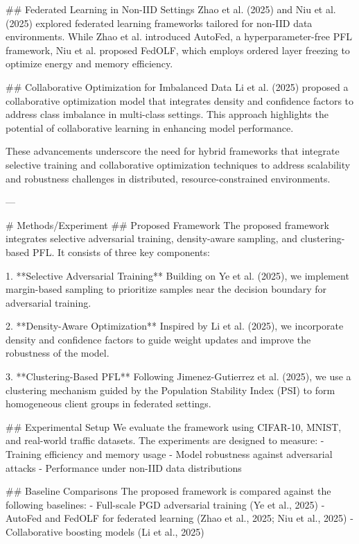 ## Federated Learning in Non-IID Settings  
Zhao et al. (2025) and Niu et al. (2025) explored federated learning frameworks tailored for non-IID data environments. While Zhao et al. introduced AutoFed, a hyperparameter-free PFL framework, Niu et al. proposed FedOLF, which employs ordered layer freezing to optimize energy and memory efficiency.  

## Collaborative Optimization for Imbalanced Data  
Li et al. (2025) proposed a collaborative optimization model that integrates density and confidence factors to address class imbalance in multi-class settings. This approach highlights the potential of collaborative learning in enhancing model performance.  

These advancements underscore the need for hybrid frameworks that integrate selective training and collaborative optimization techniques to address scalability and robustness challenges in distributed, resource-constrained environments.  

---

# Methods/Experiment  
## Proposed Framework  
The proposed framework integrates selective adversarial training, density-aware sampling, and clustering-based PFL. It consists of three key components:  

1. **Selective Adversarial Training**  
   Building on Ye et al. (2025), we implement margin-based sampling to prioritize samples near the decision boundary for adversarial training.  

2. **Density-Aware Optimization**  
   Inspired by Li et al. (2025), we incorporate density and confidence factors to guide weight updates and improve the robustness of the model.  

3. **Clustering-Based PFL**  
   Following Jimenez-Gutierrez et al. (2025), we use a clustering mechanism guided by the Population Stability Index (PSI) to form homogeneous client groups in federated settings.  

## Experimental Setup  
We evaluate the framework using CIFAR-10, MNIST, and real-world traffic datasets. The experiments are designed to measure:  
- Training efficiency and memory usage  
- Model robustness against adversarial attacks  
- Performance under non-IID data distributions  

## Baseline Comparisons  
The proposed framework is compared against the following baselines:  
- Full-scale PGD adversarial training (Ye et al., 2025)  
- AutoFed and FedOLF for federated learning (Zhao et al., 2025; Niu et al., 2025)  
- Collaborative boosting models (Li et al., 2025)  

